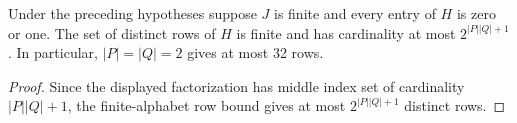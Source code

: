 \begin{lemma}
    \label{thm:mpu_phase_selector_row_count}
    \leanok
    Under the preceding hypotheses suppose $J$ is finite and every
    entry of $H$ is zero or one. The set of distinct rows of $H$ is
    finite and has cardinality at most $2^{|P||Q|+1}$.
    In particular, $|P|=|Q|=2$ gives at most 32 rows.
\end{lemma}
\begin{proof}\leanok
    Since the displayed factorization has middle index set of cardinality
    $|P||Q|+1$, the finite-alphabet row bound gives at most
    $2^{|P||Q|+1}$ distinct rows.
\end{proof}
